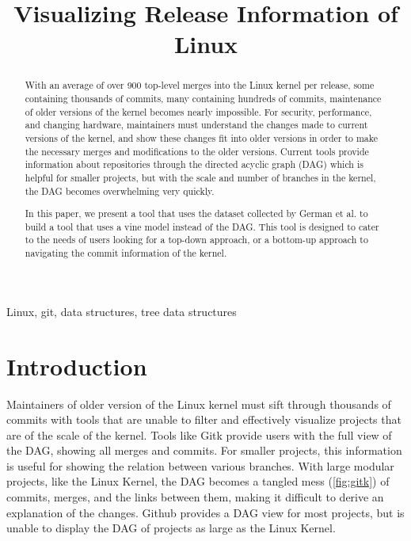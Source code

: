 \documentclass[conference, draftclsnofoot]{IEEEtran}
\makeatletter
\newcommand{\TheTitle}{Visualizing Release Information of Linux}
\newcommand{\TheAuthors}{Evan Wilde}
\newcommand{\TheEmails}{etcwilde@uvic.ca}
\newcommand{\TheKeywords}{Linux, git, data structures, tree data structures}
\makeatother
\begin{document}
\title{\TheTitle}
\author{
\IEEEauthorblockA{\TheAuthors}
\IEEEauthorblockA{Email: \TheEmails}
}
\maketitle
\begin{abstract}

	With an average of over 900 top-level merges into the Linux kernel per
	release, some containing thousands of commits, many containing hundreds
	of commits, maintenance of older versions of the kernel becomes nearly
	impossible. For security, performance, and changing hardware,
	maintainers must understand the changes made to current versions of the
	kernel, and show these changes fit into older versions in order to make
	the necessary merges and modifications to the older versions. Current
	tools provide information about repositories through the directed
	acyclic graph (DAG) which is helpful for smaller projects, but with the
	scale and number of branches in the kernel, the DAG becomes
	overwhelming very quickly.

	In this paper, we present a tool that uses the dataset collected by
	German et al. to build a tool that uses a vine model instead of the
	DAG. This tool is designed to cater to the needs of users looking for a
	top-down approach, or a bottom-up approach to navigating the commit
	information of the kernel.
\end{abstract}

\begin{IEEEkeywords}
\TheKeywords
\end{IEEEkeywords}

\section{Introduction}

Maintainers of older version of the Linux kernel must sift through thousands of
commits with tools that are unable to filter and effectively visualize projects
that are of the scale of the kernel. Tools like Gitk provide users with the
full view of the DAG, showing all merges and commits. For smaller projects,
this information is useful for showing the relation between various branches.
With large modular projects, like the Linux Kernel, the DAG becomes a tangled
mess (\ref{fig:gitk}) of commits, merges, and the links between them, making it
difficult to derive an explanation of the changes.  Github provides a DAG view
for most projects, but is unable to display the DAG of projects as large as the
Linux Kernel.
\end{document}
